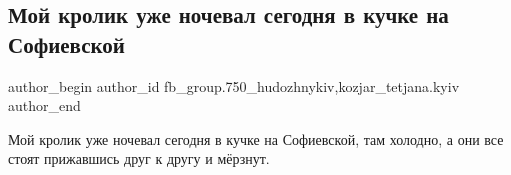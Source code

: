  
 
 
 
 

\subsection{Мой кролик уже ночевал сегодня в кучке на Софиевской}
\label{sec:03_04_2018.fb.fb_group.750_hudozhnykiv.6.moj_krolik_uzhe_nocheval_segodnja_na_sofievskoj}
 
\ifcmt
 author_begin
   author_id fb_group.750_hudozhnykiv,kozjar_tetjana.kyiv
 author_end
\fi

Мой кролик уже ночевал сегодня в кучке на Софиевской, там холодно, а они все
стоят прижавшись друг к другу и мёрзнут.

